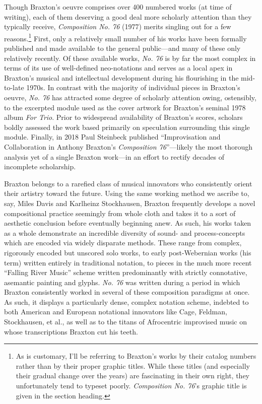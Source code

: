         Though Braxton's oeuvre comprises over 400 numbered works (at time of writing), each of them deserving a good deal more scholarly attention than they typically receive, \textit{Composition No. 76} (1977) merits singling out for a few reasons.\footnote{As is customary, I'll be referring to Braxton's works by their catalog numbers rather than by their proper graphic titles. While these titles (and especially their gradual change over the years) are fascinating in their own right, they unfortunately tend to typeset poorly. \textit{Composition No. 76}'s graphic title is given in the section heading.} First, only a relatively small number of his works have been formally published and made available to the general public---and many of these only relatively recently. Of these available works, \textit{No. 76} is by far the most complex in terms of its use of well-defined neo-notations and serves as a local apex in Braxton's musical and intellectual development during his flourishing in the mid-to-late 1970s. In contrast with the majority of individual pieces in Braxton's oeuvre, \textit{No. 76} has attracted some degree of scholarly attention owing, ostensibly, to the excerpted module used as the cover artwork for Braxton's seminal 1978 album \textit{For Trio}.\autocite{Braxton_For_Trio} Prior to widespread availability of Braxton's scores, scholars boldly assessed the work based primarily on speculation surrounding this single module. Finally, in 2018 Paul Steinbeck published ``Improvisation and Collaboration in Anthony Braxton’s \textit{Composition 76}''---likely the most thorough analysis yet of a single Braxton work---in an effort to rectify decades of incomplete scholarship.
    
        Braxton belongs to a rarefied class of musical innovators who consistently orient their artistry toward the future. Using the same working method we ascribe to, say, Miles Davis and Karlheinz Stockhausen, Braxton frequently develops a novel compositional practice seemingly from whole cloth and takes it to a sort of aesthetic conclusion before eventually beginning anew. As such, his works taken as a whole demonstrate an incredible diversity of sound- and process-concepts which are encoded via widely disparate methods. These range from complex, rigorously encoded but unscored solo works, to early post-Webernian works (his term) written entirely in traditional notation, to pieces in the much more recent ``Falling River Music'' scheme written predominantly with strictly connotative, asemantic painting and glyphs. \textit{No. 76} was written during a period in which Braxton consistently worked in several of these composition paradigms at once. As such, it displays a particularly dense, complex notation scheme, indebted to both American and European notational innovators like Cage, Feldman, Stockhausen, et al., as well as to the titans of Afrocentric improvised music on whose transcriptions Braxton cut his teeth.

